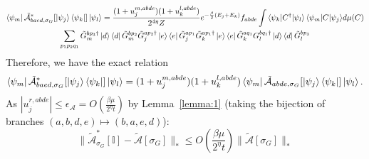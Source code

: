 \documentclass[aps,floatfix,10pt,amssymb,amsfont,amsmath,superscriptaddress,float,nofootinbib,longbibliography,nobalancelastpage,twocolumn]{revtex4-2}
\begin{document}
\begin{widetext}
\begin{multline}
   \bra{\psi_m}\tilde{\mathcal{A}}^*_{baed,\sigma_G}[\ket{\psi_j}\bra{\psi_k}]\ket{\psi_l}  =\frac{(1+u_j^{m,abde})(1+u_k^{l,abde})}{2^{4\eta}Z} e^{-\frac{\beta}{2}(E_j+E_k)}{f_{abde}} \int {\braket{\psi_k|C^{\dagger}|\psi_l}\braket{\psi_m|C|\psi_j}} d\mu(C)\\\sum_{p_1p_2q_1} \tilde G_m^{bp_3\dagger} \ket{d}\bra{d}\tilde G_m^{bp_2} {\tilde G^{ap_2\dagger}_j\ket{e}\bra{e}\tilde G^{ap_1}_j } {\tilde G^{ap_1\dagger}_k\ket{e}\bra{e}\tilde G^{aq_1}_k} G_l^{bq_1\dagger}\ket{d}\bra{d}\tilde G_l^{bp_3}
\end{multline}
Therefore, we have the exact relation
\begin{equation}
   \bra{\psi_m}\tilde{\mathcal{A}}^*_{baed,\sigma_G}[\ket{\psi_j}\bra{\psi_k}]\ket{\psi_l}
   =(1+u_j^{m,abde})(1+u_k^{l,abde})\bra{\psi_m}\tilde{\mathcal{A}}_{abde,\sigma_G}[\ket{\psi_j}\bra{\psi_k}]\ket{\psi_l}.
\end{equation}
As $|u_j^{r,abde}| \leq \epsilon_{\mathcal{A}} = O(\frac{\beta \mu}{2^{\eta}t})$ by Lemma~\ref{lemma:1} (taking the bijection of branches $(a,b,d,e) \mapsto (b,a,e,d)$):
\begin{equation}
    \|\tilde{\mathcal{A}}^*_{\sigma_G}[\mathbb{I}] - \tilde{\mathcal{A}}[\sigma_G]\|_* \leq O\left(\frac{\beta \mu}{2^{\eta}t}\right)\|\tilde{\mathcal{A}}[\sigma_G]\|_*
    \label{eq:Aoutput}
\end{equation}


\end{widetext}
\end{document}
